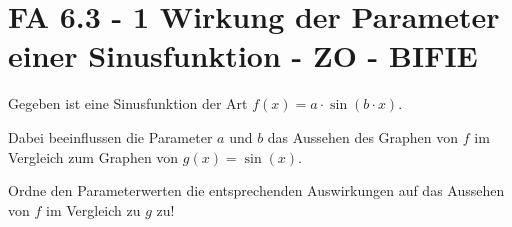 \section{FA 6.3 - 1 Wirkung der Parameter einer Sinusfunktion - ZO - BIFIE}

\begin{beispiel}[FA 6.3]{1} %
				Gegeben ist eine Sinusfunktion der Art $f(x)=a\cdot \sin(b\cdot x)$.

Dabei beeinflussen die Parameter $a$ und $b$ das Aussehen des Graphen von $f$ im Vergleich zum Graphen von $g(x)=\sin(x)$.

Ordne den Parameterwerten die entsprechenden Auswirkungen auf das Aussehen von $f$ im Vergleich zu $g$ zu!

\end{beispiel}